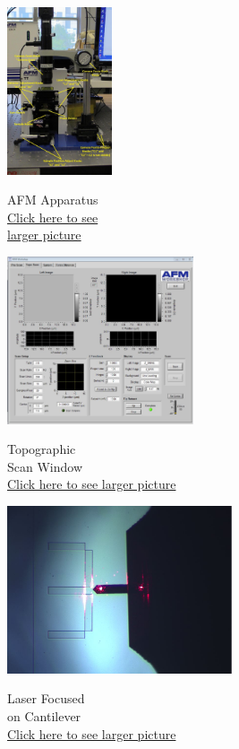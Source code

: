 \documentclass{../lab}
\begin{document}
\begin{figure}[H]
\captionsetup{justification=centering}
  \href{http://experimentationlab.berkeley.edu/sites/default/files/AFMImages/AFMgen.jpg}{\includegraphics[height=140pt,keepaspectratio]{images/AFMgen.jpg}}
  \centering
  \caption{AFM Apparatus \\ \href{http://experimentationlab.berkeley.edu/sites/default/files/AFMImages/AFMgen.jpg}{Click here to see \\ larger picture}}
  \label{fig:Apparatus}
\endminipage\hfill
{}
  \href{http://experimentationlab.berkeley.edu/sites/default/files/AFMImages/toposcan.JPG}{\includegraphics[height=140pt,keepaspectratio]{images/toposcan.JPG}}
  \caption{Topographic \\ Scan Window \\
  \href{http://experimentationlab.berkeley.edu/sites/default/files/AFMImages/toposcan.JPG}{Click here to see larger picture}}
  \label{fig:TopoScan}
\endminipage\hfill
{}
  \href{http://experimentationlab.berkeley.edu/sites/default/files/AFMImages/bothfocused.JPG}{\includegraphics[height=140pt,keepaspectratio]{images/bothfocused2.jpg}}
  \centering
  \caption{Laser Focused \\on Cantilever \\
  \href{http://experimentationlab.berkeley.edu/sites/default/files/AFMImages/bothfocused.JPG}{Click here to see larger picture}}
  \label{fig:CantileverLaser}
\endminipage
\end{figure}
\end{document}

